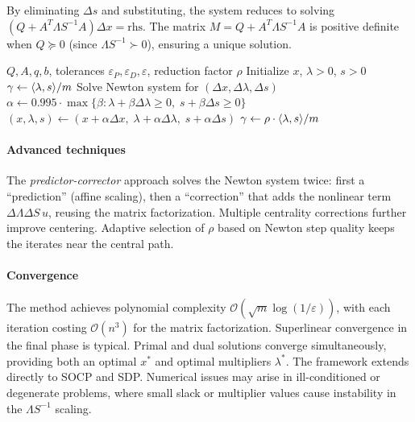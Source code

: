 By eliminating $\Delta s$ and substituting, the system reduces to solving $(Q + A^T\Lambda S^{-1}A)\Delta x = \text{rhs}$.
The matrix $M = Q + A^T\Lambda S^{-1}A$ is positive definite when $Q \succeq 0$ (since $\Lambda S^{-1} \succ 0$), ensuring a unique solution.

\begin{algorithm}
	\caption{Primal-Dual Interior Point Method (IPMQP)}
	\label{alg:ipmqp}
	\begin{algorithmic}[1]
		\Require $Q, A, q, b$, tolerances $\varepsilon_P, \varepsilon_D, \varepsilon$, reduction factor $\rho$
			\State Initialize $x$, $\lambda > 0$, $s > 0$
			\State $\gamma \gets \langle\lambda, s\rangle / m$
				\State Solve Newton system for $(\Delta x, \Delta\lambda, \Delta s)$
				\State $\alpha \gets 0.995 \cdot \max\{\beta : \lambda + \beta\Delta\lambda \geq 0,\; s + \beta\Delta s \geq 0\}$
				\State $(x, \lambda, s) \gets (x + \alpha\Delta x,\; \lambda + \alpha\Delta\lambda,\; s + \alpha\Delta s)$
				\State $\gamma \gets \rho \cdot \langle\lambda, s\rangle / m$
			\EndWhile
		\EndProcedure
	\end{algorithmic}
\end{algorithm}

\paragraph{Advanced techniques}

The \textit{predictor-corrector} approach solves the Newton system twice: first a ``prediction'' (affine scaling), then a ``correction'' that adds the nonlinear term $\Delta\Lambda\Delta S\, u$, reusing the matrix factorization.
Multiple centrality corrections further improve centering.
Adaptive selection of $\rho$ based on Newton step quality keeps the iterates near the central path.

\paragraph{Convergence}

The method achieves polynomial complexity $\mathcal{O}(\sqrt{m}\log(1/\varepsilon))$, with each iteration costing $\mathcal{O}(n^3)$ for the matrix factorization.
Superlinear convergence in the final phase is typical.
Primal and dual solutions converge simultaneously, providing both an optimal $x^*$ and optimal multipliers $\lambda^*$.
The framework extends directly to SOCP and SDP.
Numerical issues may arise in ill-conditioned or degenerate problems, where small slack or multiplier values cause instability in the $\Lambda S^{-1}$ scaling.